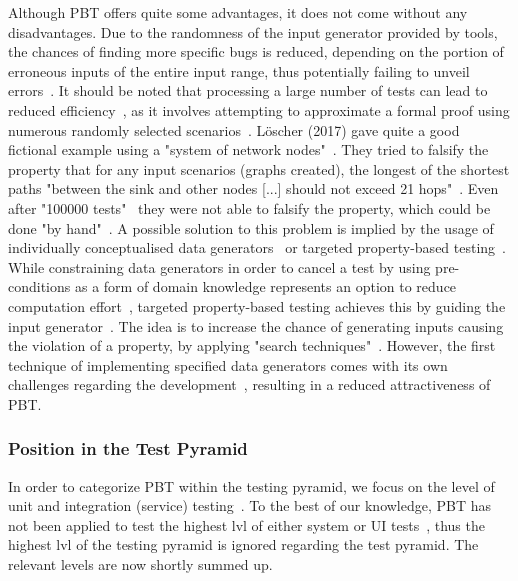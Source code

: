 \documentclass[runningheads]{llncs}
\begin{document}
Although PBT offers quite some advantages, it does not come without any disadvantages. Due to the randomness of the input generator provided by tools, the chances of finding more specific bugs is reduced, depending on the portion of erroneous inputs of the entire input range, thus potentially failing to unveil errors~\cite{Loescher2017,Padhye2019,ElazarMittelman2023,Shi2023}. It should be noted that processing a large number of tests can lead to reduced efficiency~\cite{ElazarMittelman2023,Shi2023}, as it involves attempting to approximate a formal proof using numerous randomly selected scenarios~\cite{Fink1997,ElazarMittelman2023,Paraskevopoulou2015}. Löscher (2017) gave quite a good fictional example using a "system of network nodes"~\cite{Loescher2017}. They tried to falsify the property that for any input scenarios (graphs created), the longest of the shortest paths "between the sink and other nodes [...] should not exceed 21 hops"~\cite{Loescher2017}. Even after "100000 tests"~\cite{Loescher2017} they were not able to falsify the property, which could be done "by hand"~\cite{Loescher2017}. A possible solution to this problem is implied by the usage of individually conceptualised data generators~\cite{Loescher2017,ElazarMittelman2023,Shi2023,Paraskevopoulou2015,Claessen2000} or targeted property-based testing~\cite{Loescher2017}. While constraining data generators in order to cancel a test by using pre-conditions as a form of domain knowledge represents an option to reduce computation effort~\cite{Loescher2017,ElazarMittelman2023,Shi2023}, targeted property-based testing achieves this by guiding the input generator~\cite{Loescher2017}. The idea is to increase the chance of generating inputs causing the violation of a property, by applying "search techniques"~\cite{Loescher2017}. However, the first technique of implementing specified data generators comes with its own challenges regarding the development~\cite{Loescher2017,ElazarMittelman2023,Shi2023}, resulting in a reduced attractiveness of PBT.

\subsubsection{Position in the Test Pyramid}
In order to categorize PBT within the testing pyramid, we focus on the level of unit and integration (service) testing~\cite{Aniche2022,Radziwill2020}. To the best of our knowledge, PBT has not been applied to test the highest lvl of either system or UI tests~\cite{Radziwill2020,Aniche2022}, thus the highest lvl of the testing pyramid is ignored regarding the test pyramid. The relevant levels are now shortly summed up.
\end{document}
